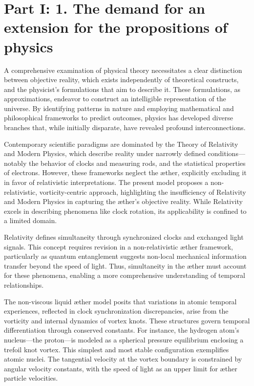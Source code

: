 \documentclass[a4paper,10pt]{article}
\begin{document}
    \section{Part I: 1. The demand for an extension for the propositions of physics}\label{sec:introduction}

A comprehensive examination of physical theory necessitates a clear distinction between objective reality, which exists independently of theoretical constructs, and the physicist's formulations that aim to describe it. These formulations, as approximations, endeavor to construct an intelligible representation of the universe. By identifying patterns in nature and employing mathematical and philosophical frameworks to predict outcomes, physics has developed diverse branches that, while initially disparate, have revealed profound interconnections.

Contemporary scientific paradigms are dominated by the Theory of Relativity and Modern Physics, which describe reality under narrowly defined conditions—notably the behavior of clocks and measuring rods, and the statistical properties of electrons. However, these frameworks neglect the æther, explicitly excluding it in favor of relativistic interpretations. The present model proposes a non-relativistic, vorticity-centric approach, highlighting the insufficiency of Relativity and Modern Physics in capturing the æther’s objective reality. While Relativity excels in describing phenomena like clock rotation, its applicability is confined to a limited domain.

Relativity defines simultaneity through synchronized clocks and exchanged light signals. This concept requires revision in a non-relativistic æther framework, particularly as quantum entanglement suggests non-local mechanical information transfer beyond the speed of light. Thus, simultaneity in the æther must account for these phenomena, enabling a more comprehensive understanding of temporal relationships.

The non-viscous liquid æther model posits that variations in atomic temporal experiences, reflected in clock synchronization discrepancies, arise from the vorticity and internal dynamics of vortex knots. These structures govern temporal differentiation through conserved constants. For instance, the hydrogen atom’s nucleus—the proton—is modeled as a spherical pressure equilibrium enclosing a trefoil knot vortex. This simplest and most stable configuration exemplifies atomic nuclei. The tangential velocity at the vortex boundary is constrained by angular velocity constants, with the speed of light as an upper limit for æther particle velocities.
\end{document}
